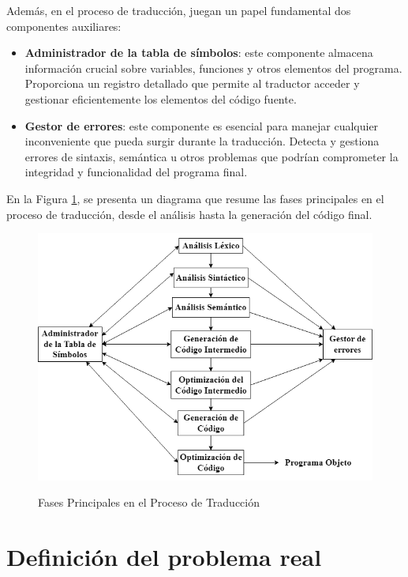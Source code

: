 Además, en el proceso de traducción, juegan un papel fundamental dos componentes auxiliares:

\begin{itemize}
    \item \textbf{Administrador de la tabla de símbolos}: este componente almacena información crucial sobre variables, funciones y otros elementos del programa. Proporciona un registro detallado que permite al traductor acceder y gestionar eficientemente los elementos del código fuente.
    
    \item \textbf{Gestor de errores}: este componente es esencial para manejar cualquier inconveniente que pueda surgir durante la traducción. Detecta y gestiona errores de sintaxis, semántica u otros problemas que podrían comprometer la integridad y funcionalidad del programa final.
\end{itemize}

En la Figura \ref{fig:fases}, se presenta un diagrama que resume las fases principales en el proceso de traducción, desde el análisis hasta la generación del código final.

\begin{figure}[htp]
    \centering
        \includegraphics[scale=0.6]{figuras/Cap1/fasescomp.png} \\
    \caption{Fases Principales en el Proceso de Traducción}\label{fig:fases}
\end{figure}

\section{Definición del problema real}

